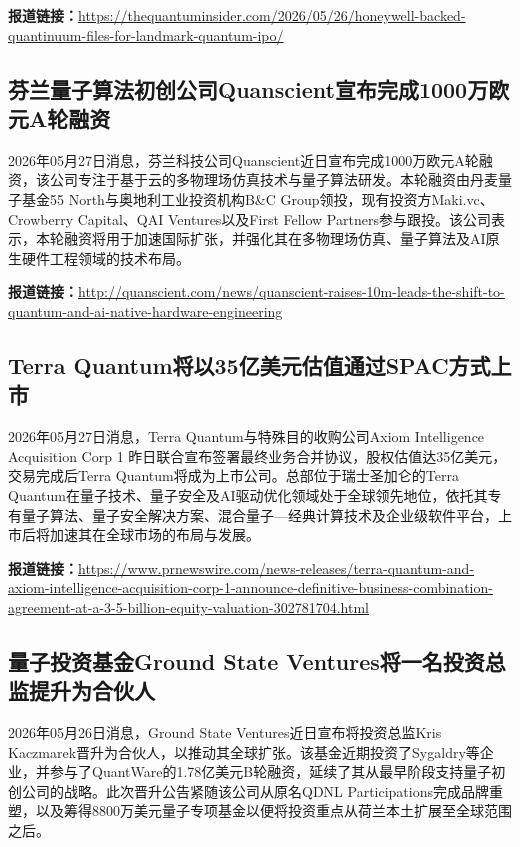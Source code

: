 \documentclass[12pt,a4paper]{ctexart}
\begin{document}
\noindent\textbf{报道链接：}\url{https://thequantuminsider.com/2026/05/26/honeywell-backed-quantinuum-files-for-landmark-quantum-ipo/}

\subsection{ 芬兰量子算法初创公司Quanscient宣布完成1000万欧元A轮融资 }

2026年05月27日消息，芬兰科技公司Quanscient近日宣布完成1000万欧元A轮融资，该公司专注于基于云的多物理场仿真技术与量子算法研发。本轮融资由丹麦量子基金55 North与奥地利工业投资机构B\&C Group领投，现有投资方Maki.vc、Crowberry Capital、QAI Ventures以及First Fellow Partners参与跟投。该公司表示，本轮融资将用于加速国际扩张，并强化其在多物理场仿真、量子算法及AI原生硬件工程领域的技术布局。

\noindent\textbf{报道链接：}\url{http://quanscient.com/news/quanscient-raises-10m-leads-the-shift-to-quantum-and-ai-native-hardware-engineering}

\subsection{ Terra Quantum将以35亿美元估值通过SPAC方式上市 }

2026年05月27日消息，Terra Quantum与特殊目的收购公司Axiom Intelligence Acquisition Corp 1 昨日联合宣布签署最终业务合并协议，股权估值达35亿美元，交易完成后Terra Quantum将成为上市公司。总部位于瑞士圣加仑的Terra Quantum在量子技术、量子安全及AI驱动优化领域处于全球领先地位，依托其专有量子算法、量子安全解决方案、混合量子—经典计算技术及企业级软件平台，上市后将加速其在全球市场的布局与发展。

\noindent\textbf{报道链接：}\url{https://www.prnewswire.com/news-releases/terra-quantum-and-axiom-intelligence-acquisition-corp-1-announce-definitive-business-combination-agreement-at-a-3-5-billion-equity-valuation-302781704.html}

\subsection{ 量子投资基金Ground State Ventures将一名投资总监提升为合伙人 }

2026年05月26日消息，Ground State Ventures近日宣布将投资总监Kris Kaczmarek晋升为合伙人，以推动其全球扩张。该基金近期投资了Sygaldry等企业，并参与了QuantWare的1.78亿美元B轮融资，延续了其从最早阶段支持量子初创公司的战略。此次晋升公告紧随该公司从原名QDNL Participations完成品牌重塑，以及筹得8800万美元量子专项基金以便将投资重点从荷兰本土扩展至全球范围之后。
\end{document}
